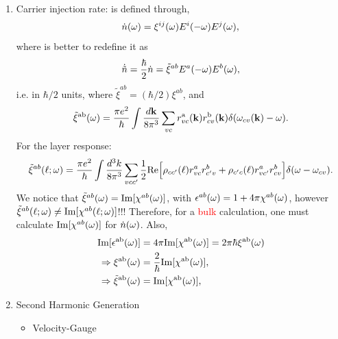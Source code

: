 \documentclass[12pt]{article}
\numberwithin{equation}{section}
\begin{document}
\begin{enumerate}
\item Carrier injection rate: is defined through,
\begin{align}\label{cir.0}
\dot n(\omega)=\xi^{ij}(\omega)E^i(-\omega)E^j(\omega)  
,
\end{align} 
where is better to redefine it as 
\begin{align}\label{cir.1}
\dot{\tilde n}=
\frac{\hbar}{2}\dot 
n=\tilde\xi^{ab}E^a(-\omega)E^b(\omega)
,
\end{align}
i.e. in $\hbar/2$ units, where
$\tilde\xi^{ab}=(\hbar/2)
\xi^{ab}$, and
\begin{equation}\label{chifp}
\tilde\xi^{\mathrm{a}\mathrm{b}}(\omega)=\frac{\pi e^2}{\hbar}
\int \frac{d\mathbf{k}}{8\pi^3}
\sum_{vc}
r^{\mathrm{a}}_{vc}(\mathbf{k})r^{\mathrm{b}}_{cv}(\mathbf{k})\delta(\omega_{cv}(\mathbf{k})-\omega)
.
\end{equation} 
For the layer response:
\begin{equation*}\label{xizn}
\tilde\xi^{ab}(\ell;\omega)
=
\frac{\pi e^2}{\hbar}
\int\frac{d^3k}{8\pi^3}
\sum_{vcc'}
\frac{1}{2}\mathrm{Re}\Big[
\rho_{cc'}(\ell)    
r^a_{vc} 
r^b_{c'v}
+
\rho_{c'c}(\ell) 
r^a_{vc'} 
r^b_{cv}
\Big]
\delta(\omega-\omega_{cv})
.
\end{equation*}
We notice that $\tilde\xi^{ab}(\omega)=\mathrm{Im}[\chi^{ab}(\omega)]$, with
$\epsilon^{ab}(\omega)=1+4\pi\chi^{ab}(\omega)$, however 
$\tilde\xi^{ab}(\ell;\omega)\neq\mathrm{Im}[\chi^{ab}(\ell;\omega)]$!!!
Therefore, for a \textcolor{red}{bulk} calculation, one must calculate
$\mathrm{Im}[\chi^{ab}(\omega)]$ for $\dot n(\omega)$.
Also,
\begin{align}\label{nn.11}
\mathrm{Im}[\epsilon^{\mathrm{a}\mathrm{b}}(\omega)]
&=
4\pi\mathrm{Im}[\chi^{\mathrm{a}\mathrm{b}}(\omega)]
=
2\pi\hbar\xi^{\mathrm{a}\mathrm{b}}(\omega)
\nonumber\\
\Rightarrow 
\xi^{\mathrm{a}\mathrm{b}}(\omega) 
&=
\frac{2}{\hbar}\mathrm{Im}[\chi^{\mathrm{a}\mathrm{b}}(\omega)],
\nonumber\\
\Rightarrow 
\tilde\xi^{\mathrm{a}\mathrm{b}}(\omega) 
&=
\mathrm{Im}[\chi^{\mathrm{a}\mathrm{b}}(\omega)],
\end{align}


\item Second Harmonic Generation
\begin{itemize}
\item Velocity-Gauge 


\end{itemize}
\end{enumerate}
\end{document}
